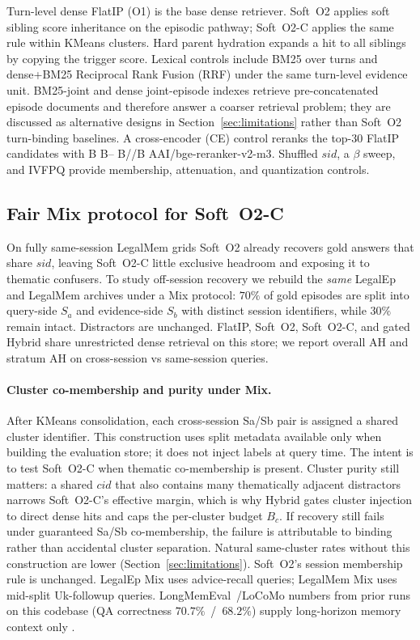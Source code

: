 \documentclass[preprint,12pt,authoryear]{elsarticle}
\DeclareRobustCommand{\modelid}[1]{{\ttfamily\modelidbreak#1\relax}}
\def\modelidbreak#1{%
  \ifx#1\relax\else
    \ifx#1--\hspace{0pt}\else
    \ifx#1//\hspace{0pt}\else#1\fi\fi
    \expandafter\modelidbreak
  \fi}
\begin{document}
Turn-level dense FlatIP (O1) is the base dense retriever.
Soft~O2 applies soft sibling score inheritance on the episodic pathway; Soft~O2-C applies the same rule within KMeans clusters.
Hard parent hydration expands a hit to all siblings by copying the trigger score.
Lexical controls include BM25 over turns and dense+BM25 Reciprocal Rank Fusion (RRF) under the same turn-level evidence unit.
BM25-joint and dense joint-episode indexes retrieve pre-concatenated episode documents and therefore answer a coarser retrieval problem; they are discussed as alternative designs in Section~\ref{sec:limitations} rather than Soft~O2 turn-binding baselines.
A cross-encoder (CE) control reranks the top-$30$ FlatIP candidates with \modelid{BAAI/bge-reranker-v2-m3}.
Shuffled $sid$, a $\beta$ sweep, and IVFPQ provide membership, attenuation, and quantization controls.

\subsection{Fair Mix protocol for Soft~O2-C}\label{sec:csce-protocol}
On fully same-session LegalMem grids Soft~O2 already recovers gold answers that share $sid$, leaving Soft~O2-C little exclusive headroom and exposing it to thematic confusers.
To study off-session recovery we rebuild the \emph{same} LegalEp and LegalMem archives under a Mix protocol: $70\%$ of gold episodes are split into query-side $S_a$ and evidence-side $S_b$ with distinct session identifiers, while $30\%$ remain intact.
Distractors are unchanged.
FlatIP, Soft~O2, Soft~O2-C, and gated Hybrid share unrestricted dense retrieval on this store; we report overall AH and stratum AH on cross-session vs same-session queries.

\paragraph{Cluster co-membership and purity under Mix.}
After KMeans consolidation, each cross-session Sa/Sb pair is assigned a shared cluster identifier.
This construction uses split metadata available only when building the evaluation store; it does not inject labels at query time.
The intent is to test Soft~O2-C when thematic co-membership is present.
Cluster purity still matters: a shared $cid$ that also contains many thematically adjacent distractors narrows Soft~O2-C's effective margin, which is why Hybrid gates cluster injection to direct dense hits and caps the per-cluster budget $B_c$.
If recovery still fails under guaranteed Sa/Sb co-membership, the failure is attributable to binding rather than accidental cluster separation.
Natural same-cluster rates without this construction are lower (Section~\ref{sec:limitations}).
Soft~O2's session membership rule is unchanged.
LegalEp Mix uses advice-recall queries; LegalMem Mix uses mid-split Uk-followup queries.
LongMemEval~/LoCoMo numbers from prior runs on this codebase (QA correctness $70.7\%$~/~$68.2\%$) supply long-horizon memory context only \cite{wu2025longmemeval, maharana2024evaluating}.
\end{document}

